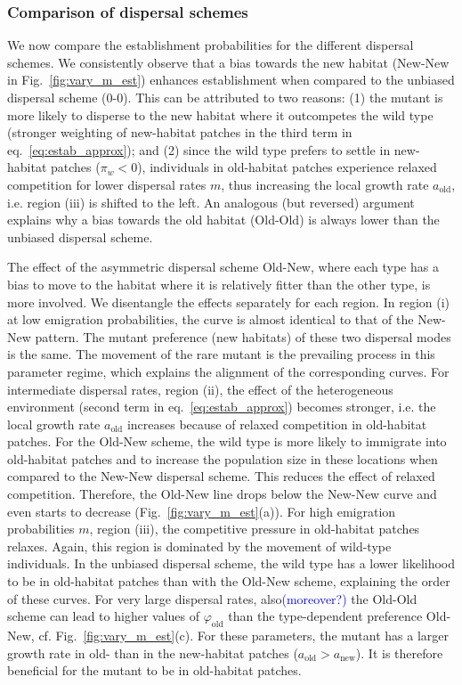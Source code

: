 \documentclass[a4paper,11pt]{article}
\newcommand{\francois}[1]{\textcolor{blue}{(#1)}}
\newcommand{\chg}[1]{\textcolor{change}{#1}}
\begin{document}
\subsubsection*{Comparison of dispersal schemes}

We now compare the establishment probabilities for the different dispersal schemes. 
We consistently observe that \chg{a bias towards the new habitat (New-New} in Fig.~\ref{fig:vary_m_est}) enhances establishment when compared to the \chg{unbiased} dispersal scheme (0-0). This can be attributed to two reasons: (1) the mutant is more likely to disperse to the new habitat where it outcompetes the wild type (stronger weighting of new-habitat patches in the third term in eq.~\eqref{eq:estab_approx}); and (2) since the wild type prefers to settle in new-habitat patches ($\pi_w<0$), individuals in old-habitat patches experience relaxed competition for lower dispersal rates $m$, thus increasing the local growth rate $a_{\text{old}}$, i.e. region (iii) is shifted to the left. An analogous (but reversed) argument explains why \chg{a bias towards the old habitat (Old-Old}) is always lower than the \chg{unbiased} dispersal scheme. 

The effect of \chg{the asymmetric dispersal scheme Old-New}, where each type has a bias to move to the habitat where it is relatively fitter than the other type, is more involved. We disentangle the effects separately for each region. In region (i) at low emigration probabilities, the curve is almost identical to that of the \chg{New-New} pattern. The mutant preference \chg{(new habitats)} of these two dispersal modes is the same. The movement of the rare mutant is the prevailing process in this parameter regime, which explains the alignment of the \chg{corresponding} curves. 
For intermediate dispersal rates, region (ii), the effect of the heterogeneous environment (second term in eq.~\eqref{eq:estab_approx}) becomes stronger, i.e. the local growth rate $a_{\text{old}}$ increases because of relaxed competition in old-habitat patches. 
For the \chg{Old-New scheme}, the wild type is more likely to immigrate into old-habitat patches and to increase the population size in these locations \chg{when compared to the New-New dispersal scheme}. This reduces the effect of relaxed competition. Therefore, the \chg{Old-New line} drops below the \chg{New-New} curve and even starts to decrease (Fig.~\ref{fig:vary_m_est}(a)). For high emigration probabilities $m$, region (iii), the competitive pressure in old-habitat patches relaxes. Again, this region is dominated by the movement of wild-type individuals. In the \chg{unbiased} dispersal scheme, the wild type has a lower likelihood to be in old-habitat patches than with the \chg{Old-New} scheme, explaining the \chg{order of these} curves. 
For very large dispersal rates, also\francois{moreover?} the \chg{Old-Old} scheme can lead to higher values of $\varphi_{\text{old}}$ than \chg{the type-dependent preference Old-New}, cf. Fig.~\ref{fig:vary_m_est}(c). For these parameters, the mutant has a larger growth rate in old- than in the new-habitat patches ($a_{\text{old}}>a_{\text{new}}$). It is therefore beneficial for the mutant to \chg{be in} old-habitat patches. 
\end{document}
